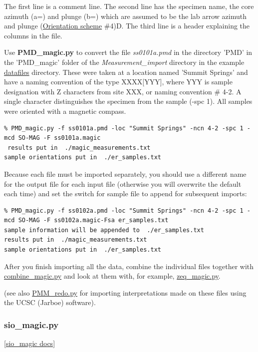 \documentclass[11pt]{book}
\begin{document}
{{{The first line is a comment line.  The second line has the specimen name, the core azimuth (a=) and plunge (b=) which are assumed to be the lab arrow azimuth and plunge (\href{#orientation_schemes}{Orientation scheme} \#4)D.   The third line is a header explaining the columns in the file.     


Use {\bf PMD\_magic.py} to convert the file {\it ss0101a.pmd} in the directory 'PMD' in the 'PMD\_magic' folder of the {\it Measurement\_import} directory in the example \href{#Datafiles}{datafiles} directory.  These were taken at a location named 'Summit Springs' and have a naming convention of the type XXXX[YYY], where  YYY is sample designation with Z characters from site XXX, or naming convention \# 4-2.  A single character distinguishes the specimen from the sample (-spc 1).  All samples were oriented with a magnetic compass.  

\begin{verbatim}
% PMD_magic.py -f ss0101a.pmd -loc "Summit Springs" -ncn 4-2 -spc 1 -mcd SO-MAG -F ss0101a.magic
 results put in  ./magic_measurements.txt
sample orientations put in  ./er_samples.txt
\end{verbatim}

Because each file must be imported separately, you should use a different name for the output file for each input file (otherwise you will overwrite the default each time) and set the switch  for sample file to append for subsequent imports:

\begin{verbatim}
% PMD_magic.py -f ss0102a.pmd -loc "Summit Springs" -ncn 4-2 -spc 1 -mcd SO-MAG -F ss0102a.magic-Fsa er_samples.txt 
sample information will be appended to  ./er_samples.txt
results put in  ./magic_measurements.txt
sample orientations put in  ./er_samples.txt
\end{verbatim}
After you finish importing all the data, combine the individual files together with \href{#combine_magic.py}{combine\_magic.py} and look at them with, for example, \href{#zeq_magic.py}{zeq\_magic.py}.  

(see also \href{#PMM_redo.py}{PMM\_redo.py}  for importing interpretations made on these files using the UCSC (Jarboe)   software).  

\subsubsection {sio\_magic.py}
\href{http://earthref.org/PmagPy/pmagpydocs/sio_magic-module.html}{[sio\_magic docs]}


}}}
\end{document}
